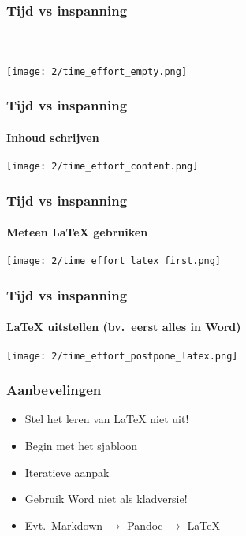 \documentclass[aspectratio=169]{beamer}
\begin{document}
\begin{frame}
  \frametitle{Tijd vs inspanning}
  \framesubtitle{~}

  \begin{center}
    \texttt{[image: 2/time\_effort\_empty.png]}
  \end{center}

\end{frame}

\begin{frame}
  \frametitle{Tijd vs inspanning}
  \framesubtitle{Inhoud schrijven}

  \begin{center}
    \texttt{[image: 2/time\_effort\_content.png]}
  \end{center}

\end{frame}

\begin{frame}
  \frametitle{Tijd vs inspanning}
  \framesubtitle{Meteen {\LaTeX} gebruiken}

  \begin{center}
    \texttt{[image: 2/time\_effort\_latex\_first.png]}
  \end{center}

\end{frame}

\begin{frame}
  \frametitle{Tijd vs inspanning}
  \framesubtitle{{\LaTeX} uitstellen (bv.\ eerst alles in Word)}

  \begin{center}
    \texttt{[image: 2/time\_effort\_postpone\_latex.png]}
  \end{center}

\end{frame}

\begin{frame}
  \frametitle{Aanbevelingen}

  \begin{itemize}
    \item Stel het leren van {\LaTeX} niet uit!
    \item Begin met het sjabloon
    \item Iteratieve aanpak
    \item \alert{Gebruik Word niet als kladversie!}
    \item Evt.\ Markdown $\rightarrow$ Pandoc $\rightarrow$ {\LaTeX}
  \end{itemize}

\end{frame}
\end{document}

